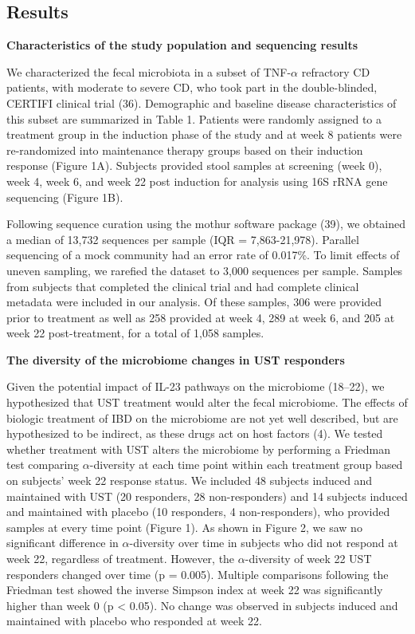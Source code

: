 \documentclass[11pt,]{article}
\begin{document}
\subsection{Results}\label{results}

\textbf{Characteristics of the study population and sequencing results}

We characterized the fecal microbiota in a subset of TNF-\({\alpha}\)
refractory CD patients, with moderate to severe CD, who took part in the
double-blinded, CERTIFI clinical trial (36). Demographic and baseline
disease characteristics of this subset are summarized in Table 1.
Patients were randomly assigned to a treatment group in the induction
phase of the study and at week 8 patients were re-randomized into
maintenance therapy groups based on their induction response (Figure
1A). Subjects provided stool samples at screening (week 0), week 4, week
6, and week 22 post induction for analysis using 16S rRNA gene
sequencing (Figure 1B).

Following sequence curation using the mothur software package (39), we
obtained a median of 13,732 sequences per sample (IQR = 7,863-21,978).
Parallel sequencing of a mock community had an error rate of 0.017\%. To
limit effects of uneven sampling, we rarefied the dataset to 3,000
sequences per sample. Samples from subjects that completed the clinical
trial and had complete clinical metadata were included in our analysis.
Of these samples, 306 were provided prior to treatment as well as 258
provided at week 4, 289 at week 6, and 205 at week 22 post-treatment,
for a total of 1,058 samples.

\textbf{The diversity of the microbiome changes in UST responders}

Given the potential impact of IL-23 pathways on the microbiome (18--22),
we hypothesized that UST treatment would alter the fecal microbiome. The
effects of biologic treatment of IBD on the microbiome are not yet well
described, but are hypothesized to be indirect, as these drugs act on
host factors (4). We tested whether treatment with UST alters the
microbiome by performing a Friedman test comparing
\({\alpha}\)-diversity at each time point within each treatment group
based on subjects' week 22 response status. We included 48 subjects
induced and maintained with UST (20 responders, 28 non-responders) and
14 subjects induced and maintained with placebo (10 responders, 4
non-responders), who provided samples at every time point (Figure 1). As
shown in Figure 2, we saw no significant difference in
\({\alpha}\)-diversity over time in subjects who did not respond at week
22, regardless of treatment. However, the \({\alpha}\)-diversity of week
22 UST responders changed over time (p = 0.005). Multiple comparisons
following the Friedman test showed the inverse Simpson index at week 22
was significantly higher than week 0 (p \textless{} 0.05). No change was
observed in subjects induced and maintained with placebo who responded
at week 22.
\end{document}
